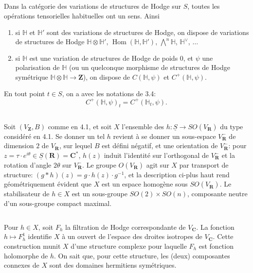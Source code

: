 \documentclass[11pt]{amsart}
\theoremstyle{plain}
\theoremstyle{definition}
\theoremstyle{remark}
\begin{document}
\subsection*{}
Dans la cat\'egorie des variations de structures de Hodge sur $S$, toutes les op\'erations tensorielles habituelles ont un sens. Ainsi
\begin{enumerate}
\item[a)] si $\mathbb{H}$ et $\mathbb{H}'$ sont des variations de structures de Hodge, on dispose de variations de structures de Hodge $\mathbb{H}\otimes\mathbb{H}'$, $\operatorname{Hom}(\mathbb{H},\mathbb{H}')$, $\bigwedge^n\mathbb{H}$, $\mathbb{H}^\vee$, $\ldots$
\item[b)] si $\mathbb{H}$ est une variation de structures de Hodge de poids $0$, et $\psi$ une polarisation de $\mathbb{H}$ (ou un quelconque morphisme de structures de Hodge sym\'etrique $\mathbb{H}\otimes\mathbb{H}\to\mathbf{Z}$), on dispose de $C(\mathbb{H},\psi)$ et $C^+(\mathbb{H},\psi)$.
\end{enumerate}
En tout point $t\in S$, on a avec les notations de 3.4:
\begin{equation*}
C^+(\mathbb{H},\psi)_t=C^+(\mathbb{H}_t,\psi).
\end{equation*}

\subsection*{}
Soit $(V_\mathbf{Z},B)$ comme en 4.1, et soit $X$ l'ensemble des $h\colon\underline{S}\to SO(V_\mathbf{R})$ du type consid\'er\'e en 4.1. Se donner un tel $h$ revient \`a se donner un sous-espace $V_\mathbf{R}^-$ de dimension $2$ de $V_\mathbf{R}$, sur lequel $B$ est d\'efini n\'egatif, et une orientation de $V_\mathbf{R}^-$: pour $z=\tau\cdot e^{i\theta}\in\underline{S}(\mathbf{R})=\mathbf{C}^*$, $h(z)$ induit l'identit\'e sur l'orthogonal de $V_\mathbf{R}^-$ et la rotation d'angle $2\theta$ sur $V_\mathbf{R}^-$. Le groupe $O(V_\mathbf{R})$ agit sur $X$ par transport de structure: $(g*h)(z)=g\cdot h(z)\cdot g^{-1}$, et la description ci-plus haut rend g\'eom\'etriquement \'evident que $X$ est un espace homog\`ene sous $SO(V_\mathbf{R})$. Le stabilisateur de $h\in X$ est un sous-groupe $SO(2)\times SO(n)$, composante neutre d'un sous-groupe compact maximal.

\subsection*{}
Pour $h\in X$, soit $F_h$ la filtration de Hodge correspondante de $V_\mathbf{C}$. La fonction $h\mapsto F_h^1$ identifie $X$ \`a un ouvert de l'espace des droites isotropes de $V_\mathbf{C}$. Cette construction munit $X$ d'une structure complexe pour laquelle $F_h$ est fonction holomorphe de $h$. On sait que, pour cette structure, les (deux) composantes connexes de $X$ sont des domaines hermitiens sym\'etriques.
\end{document}
